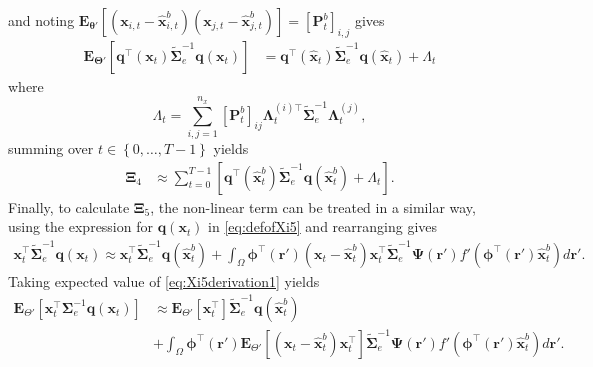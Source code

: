 \documentclass[]{article}
\begin{document}
and noting $\mathbf E_{\boldsymbol\theta'}\left[(\mathbf x_{i,t} - \mathbf  {\hat x}_{i,t}^b)(\mathbf x_{j,t} - \mathbf  {\hat x}_{j,t}^b) \right]=\left[\mathbf{P}_t^b\right]_{i,j} $ gives
\begin{align}
 \mathbf{E}_{\boldsymbol\Theta'}\left[ \mathbf q^\top(\mathbf x_t)\tilde{\boldsymbol\Sigma}_e^{-1}\mathbf q(\mathbf x_t)\right]&= \mathbf q^\top(\mathbf {\hat x}_t)\tilde{\boldsymbol\Sigma}_e^{-1}\mathbf q(\mathbf {\hat x}_t)+\boldsymbol\varLambda_t
\end{align}
where
\begin{equation}
 \boldsymbol\varLambda_t=\sum_{i,j=1}^{n_x}[\mathbf{P}_t^b]_{ij}{\boldsymbol\Lambda}_t^{(i)\top}\tilde{\boldsymbol\Sigma}_e^{-1}{\boldsymbol\Lambda}_t^{(j)},
\end{equation}
summing over $t \in \left\lbrace 0, \dots, T-1\right\rbrace $ yields
\begin{align}
 \boldsymbol\Xi_{4}&\approx\sum_{t=0}^{T-1}\left[\mathbf q^\top(\mathbf{\hat x}_t^b)\tilde{\boldsymbol\Sigma}_e^{-1}\mathbf q(\mathbf{\hat x}_t^b)+\boldsymbol\varLambda_t\right]\label{eq:Xi4Ap}. 
\end{align}
Finally, to calculate $\boldsymbol\Xi_5$, the non-linear term can be treated in a similar way, using the expression for $\mathbf q(\mathbf x_t)$ in \eqref{eq:defofXi5} and rearranging gives
\begin{align}\label{eq:Xi5derivation1}
 \mathbf x_t^\top\tilde{\boldsymbol\Sigma}_e^{-1}\mathbf q(\mathbf x_t)\approx\mathbf x_t^\top\tilde{\boldsymbol\Sigma}_e^{-1}\mathbf q(\mathbf {\hat x}_t^b)+\int_\Omega \boldsymbol \phi^\top(\mathbf r') (\mathbf x_t - \mathbf  {\hat x}_t^b)\mathbf x_t^\top\tilde{\boldsymbol\Sigma}_e^{-1}\boldsymbol{\Psi}(\mathbf{r}')f'(\boldsymbol \phi^\top(\mathbf r')\mathbf {\hat x}_t^b) d\mathbf{r}'.
\end{align}
Taking expected value of \eqref{eq:Xi5derivation1} yields
\begin{align}\label{eq:Xi5derivation2}
\mathbf E_{\Theta'}\left[\mathbf x_t^\top\boldsymbol\Sigma_e^{-1}\mathbf q(\mathbf x_t)\right]&\approx\mathbf E_{\Theta'}\left[\mathbf x_t^\top\right]\tilde{\boldsymbol\Sigma}_e^{-1}\mathbf q(\mathbf {\hat x}_t^b)\nonumber \\
&+\int_\Omega \boldsymbol \phi^\top(\mathbf r') \mathbf E_{\Theta'}\left[(\mathbf x_t - \mathbf  {\hat x}_t^b)\mathbf x_t^\top\right]\tilde{\boldsymbol\Sigma}_e^{-1}\boldsymbol{\Psi}(\mathbf{r}')f'(\boldsymbol \phi^\top(\mathbf r')\mathbf {\hat x}_t^b) d\mathbf{r}'.
\end{align}
\end{document}
